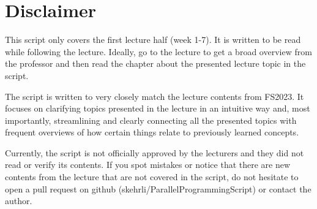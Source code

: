 \documentclass[main]{subfiles}
\begin{document}
\section{Disclaimer}
This script only covers the first lecture half (week 1-7). It is written to be read while following the lecture. Ideally, go to the lecture to get a broad overview from the professor and then read the chapter about the presented lecture topic in the script.

The script is written to very closely match the lecture contents from FS2023. It focuses on clarifying topics presented in the lecture in an intuitive way and, most importantly, streamlining and clearly connecting all the presented topics with frequent overviews of how certain things relate to previously learned concepts.

Currently, the script is not officially approved by the lecturers and they did not read or verify its contents. If you spot mistakes or notice that there are new contents from the lecture that are not covered in the script, do not hesitate to open a pull request on github (skehrli/ParallelProgrammingScript) or contact the author.
\end{document}
